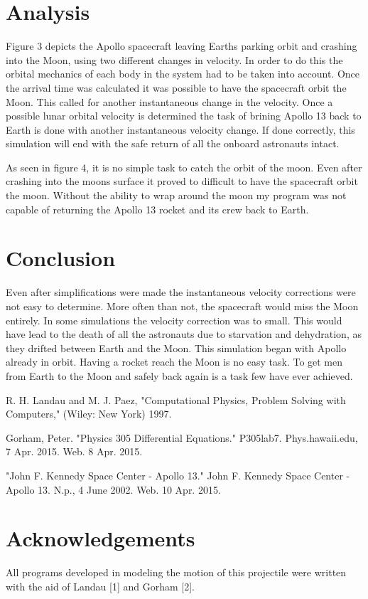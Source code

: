 \documentclass[11pt]{article}
\begin{document}
\section{Analysis}
Figure 3 depicts the Apollo spacecraft leaving Earths parking orbit and crashing into the Moon, using two different 
changes in velocity.  In order to do this the 
orbital mechanics of each body in the system had to be taken into account.  Once the arrival time was calculated it was 
possible to have the spacecraft orbit the Moon.  This called for another instantaneous change in the velocity.  Once a possible 
lunar orbital velocity is determined the task of brining Apollo 13 back to Earth is done with another instantaneous velocity 
change.  If done correctly, this simulation will end with the safe return of all the onboard astronauts intact.


As seen in figure 4, it is no simple task to catch the orbit of the moon.  Even after crashing into the moons surface it proved 
to difficult to have the spacecraft orbit the moon.  Without the ability to wrap around the moon my program was not capable 
of returning the Apollo 13 rocket and its crew back to Earth.



\section{Conclusion}

Even after simplifications were made the instantaneous velocity corrections were not easy to determine.  More often than not,
the spacecraft would miss the Moon entirely.  In some simulations the velocity correction was to small.  This would have lead 
to the death of all the astronauts due to starvation and dehydration, as they drifted between Earth and the Moon.  This 
simulation began with Apollo already in orbit.  Having a rocket reach the Moon is no easy task.  To get men from Earth to the 
Moon and safely back again is a task few have ever achieved.


\setlength{\parindent}{0cm}

\begin{thebibliography}{99}  %

 R. H. Landau and M. J. Paez, "Computational Physics, Problem Solving with Computers," (Wiley: New York) 1997.


 Gorham, Peter. "Physics 305 Differential Equations." P305lab7. Phys.hawaii.edu, 7 Apr. 2015. Web. 8 Apr. 2015.

  "John F. Kennedy Space Center - Apollo 13." John F. Kennedy Space Center - Apollo 13. N.p., 4 June 2002. Web. 10 Apr. 2015.

\end{thebibliography}

\section*{Acknowledgements}
All programs developed in modeling the motion of this projectile were written with the aid of Landau [1] and Gorham [2].
\end{document}
